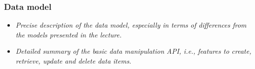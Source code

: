 
\begin{frame}
\frametitle{Data model}
\begin{itemize}
\item \emph{Precise description of the data model, especially in terms of differences from the  models presented in the lecture.}
\item \emph{Detailed summary of the basic data manipulation API, i.e., features to create, retrieve, update and delete data items.}
\end{itemize}
\end{frame} 